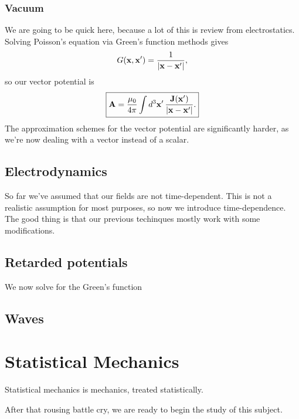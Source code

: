 \documentclass[11pt]{article}
\begin{document}
\subsubsection{Vacuum}

We are going to be quick here, because a lot of this is review from
electrostatics. Solving Poisson's equation via Green's function
methods gives
\begin{align*}
    G(\mathbf{x}, \mathbf{x}') = \frac{1}{|\mathbf{x} - \mathbf{x}'|}, 
\end{align*}
so our vector potential is
\begin{align*}
    \boxed{\mathbf{A} = \frac{\mu_0}{4\pi} \int d^3 \mathbf{x}' \, \frac{\mathbf{J}(\mathbf{x}')}{|\mathbf{x} - \mathbf{x}'|}.}
\end{align*}
The approximation schemes for the vector potential are significantly
harder, as we're now dealing with a vector instead of a scalar.



\subsection{Electrodynamics}

So far we've assumed that our fields are not time-dependent.
This is not a realistic assumption for most purposes, so now
we introduce time-dependence. The good thing is that our previous 
techinques mostly work with some modifications.

\subsection{Retarded potentials}

We now solve for the Green's function 

\subsection{Waves}
\newpage

\section{Statistical Mechanics}

\begin{iidea}
    Statistical mechanics is mechanics, treated statistically.
\end{iidea}
After that rousing battle cry, we are ready to begin the study
of this subject.
\end{document}
